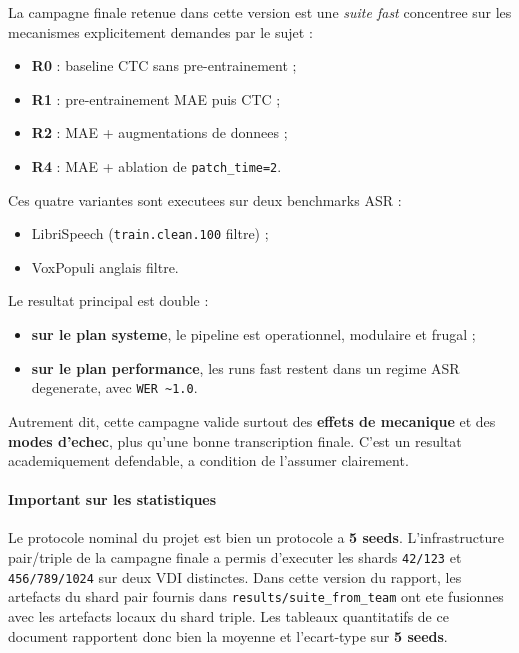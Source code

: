\documentclass[11pt,a4paper]{article}
\begin{document}
La campagne finale retenue dans cette version est une \textit{suite fast} concentree sur les mecanismes explicitement demandes par le sujet :
\begin{itemize}[leftmargin=1.2cm]
\item \textbf{R0} : baseline CTC sans pre-entrainement ;
\item \textbf{R1} : pre-entrainement MAE puis CTC ;
\item \textbf{R2} : MAE + augmentations de donnees ;
\item \textbf{R4} : MAE + ablation de \texttt{patch\_time=2}.
\end{itemize}

Ces quatre variantes sont executees sur deux benchmarks ASR :
\begin{itemize}[leftmargin=1.2cm]
\item LibriSpeech (\texttt{train.clean.100} filtre) ;
\item VoxPopuli anglais filtre.
\end{itemize}

Le resultat principal est double :
\begin{itemize}[leftmargin=1.2cm]
\item \textbf{sur le plan systeme}, le pipeline est operationnel, modulaire et frugal ;
\item \textbf{sur le plan performance}, les runs fast restent dans un regime ASR degenerate, avec \texttt{WER \textasciitilde 1.0}.
\end{itemize}

Autrement dit, cette campagne valide surtout des \textbf{effets de mecanique} et des \textbf{modes d'echec}, plus qu'une bonne transcription finale. C'est un resultat academiquement defendable, a condition de l'assumer clairement.

\paragraph{Important sur les statistiques}
Le protocole nominal du projet est bien un protocole a \textbf{5 seeds}. L'infrastructure pair/triple de la campagne finale a permis d'executer les shards \texttt{42/123} et \texttt{456/789/1024} sur deux VDI distinctes. Dans cette version du rapport, les artefacts du shard pair fournis dans \texttt{results/suite\_from\_team} ont ete fusionnes avec les artefacts locaux du shard triple. Les tableaux quantitatifs de ce document rapportent donc bien la moyenne et l'ecart-type sur \textbf{5 seeds}.
\end{document}
